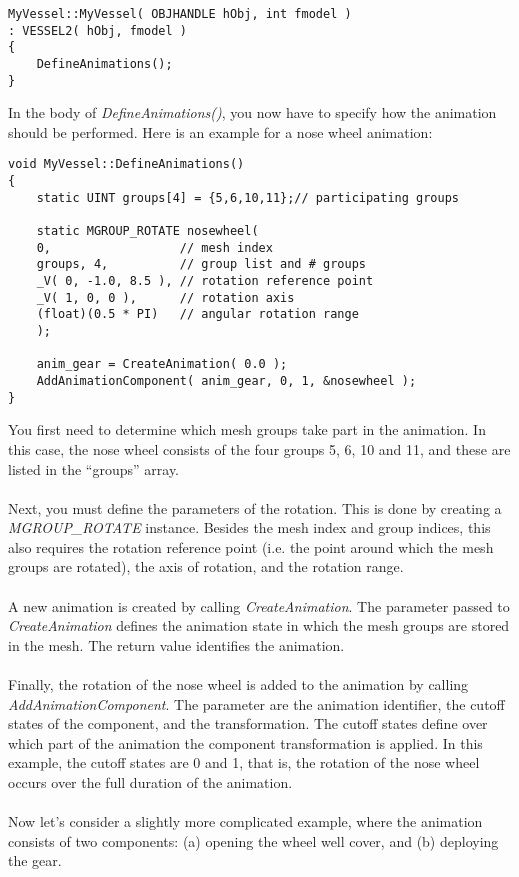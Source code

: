\documentclass[Orbiter Developer Manual.tex]{subfiles}
\begin{document}
\begin{lstlisting}
MyVessel::MyVessel( OBJHANDLE hObj, int fmodel )
: VESSEL2( hObj, fmodel )
{
	DefineAnimations();
}
\end{lstlisting}

\noindent
In the body of \textit{DefineAnimations()}, you now have to specify how the animation should be performed. Here is an example for a nose wheel animation:

\begin{lstlisting}
void MyVessel::DefineAnimations()
{
	static UINT groups[4] = {5,6,10,11};// participating groups

	static MGROUP_ROTATE nosewheel(
	0,					// mesh index
	groups, 4,			// group list and # groups
	_V( 0, -1.0, 8.5 ),	// rotation reference point
	_V( 1, 0, 0 ),		// rotation axis
	(float)(0.5 * PI)	// angular rotation range
	);

	anim_gear = CreateAnimation( 0.0 );
	AddAnimationComponent( anim_gear, 0, 1, &nosewheel );
}
\end{lstlisting}

\noindent
You first need to determine which mesh groups take part in the animation. In this case, the nose wheel consists of the four groups 5, 6, 10 and 11, and these are listed in the “groups” array.\\
\\
Next, you must define the parameters of the rotation. This is done by creating a \textit{MGROUP\_ROTATE} instance. Besides the mesh index and group indices, this also requires the rotation reference point (i.e. the point around which the mesh groups are rotated), the axis of rotation, and the rotation range.\\
\\
A new animation is created by calling \textit{CreateAnimation}. The parameter passed to \textit{CreateAnimation} defines the animation state in which the mesh groups are stored in the mesh. The return value identifies the animation.\\
\\
Finally, the rotation of the nose wheel is added to the animation by calling \textit{AddAnimationComponent}. The parameter are the animation identifier, the cutoff states of the component, and the transformation. The cutoff states define over which part of the animation the component transformation is applied. In this example, the cutoff states are 0 and 1, that is, the rotation of the nose wheel occurs over the full duration of the animation.\\
\\
Now let’s consider a slightly more complicated example, where the animation consists of two components: (a) opening the wheel well cover, and (b) deploying the gear.
\end{document}
